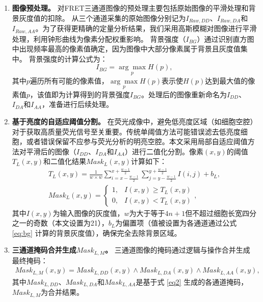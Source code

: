 \begin{enumerate}
\item \textbf{图像预处理。}
对FRET三通道图像的预处理主要包括原始图像的平滑处理和背景灰度值的扣除。
从三个通道采集的原始图像分别记为$I_{Raw,DD}$、$I_{Raw,DA}$和$I_{Raw,AA}$。为了获得更精确的定量分析结果，我们采用高斯模糊对图像进行平滑处理，利用钟形曲线为像素分配权重影响。  
背景强度（$I_{BG}$）通过识别直方图中出现频率最高的像素值确定，因为图像中大部分像素属于背景且灰度值集中。
背景强度的计算公式为：
\begin{equation}
    I_{BG} = \underset{p}{\arg\max} H(p), 
    \label{eq:bg}
\end{equation}
其中$p$遍历所有可能的像素值，$\underset{p}{\arg\max} H(p)$表示使$H(p)$达到最大值的像素值$p$，该值即为计算得到的背景强度$I_{BG}$。处理后的图像重新命名为$I_{DD}$、$I_{DA}$和$I_{AA}$，准备进行后续处理。

\item \textbf{基于亮度的自适应阈值分割。}  
在荧光成像中，避免低亮度区域（如细胞空腔）对于获取高质量荧光信号至关重要。传统单阈值方法可能错误滤去低亮度细胞，或者错误保留不应参与荧光分析的明亮空腔。本文采用局部自适应阈值方法对平滑后的图像（$I_{DD}$、$I_{DA}$和$I_{AA}$）进行二值化分割。像素$(x, y)$的阈值$T_L(x,y)$和二值化结果${Mask}_L(x,y)$计算如下：
\begin{align}
    T_L(x,y)=\frac{1}{w \times w} \sum_{i=x-\frac{w-1}{2}}^{x+\frac{w-1}{2}} \sum_{j=y-\frac{w-1}{2}}^{y+\frac{w-1}{2}} I(i,j)+b_L,
    \label{eq1} \\
    {Mask}_L(x,y)=\begin{cases}
        1,&I(x,y) \geq T_L(x,y) \\
        0,&I(x,y) < T_L(x,y)
    \end{cases},
    \label{eq2}
\end{align}
其中$I(x,y)$为输入图像的灰度值，$w$为大于等于$4n+1$但不超过细胞长宽四分之一的奇数（本文设置为21），$b_L$为偏置项（值被设置为各通道通过公式 \ref{eq:bg} 计算的背景灰度值），确保完全去除背景区域。

\item \textbf{三通道掩码合并生成${Mask}_{L, M}$。}  
三通道图像的掩码通过逻辑与操作合并生成最终掩码：
\begin{equation}
    \begin{split}
    {Mask}_{L, M}(x,y)={Mask}_{L, DD}(x,y) \land {Mask}_{L, DA}(x,y) \land {Mask}_{L, AA}(x,y),
    \end{split}
    \label{eq3}
\end{equation}
其中${Mask}_{L, DD}$、${Mask}_{L, DA}$和${Mask}_{L, AA}$是基于式 \ref{eq2} 生成的各通道掩码，${Mask}_{L, M}$为合并结果。


\end{enumerate}
